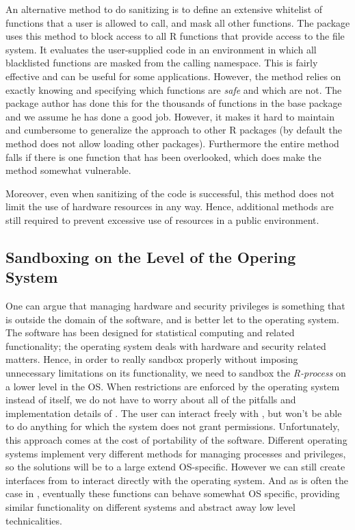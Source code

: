 \documentclass[article]{jss}
\begin{document}
An alternative method to do sanitizing is to define an extensive whitelist of
functions that a user is allowed to call, and mask all other functions. The
 \citep{sandboxR} package uses this method to block access
to all R functions that provide access to the file system. It evaluates
the user-supplied code in an environment in which all blacklisted
functions are masked from the calling namespace. This is fairly effective and
can be useful for some applications. However, the method relies on exactly
knowing and specifying which functions are \emph{safe} and which are not. The
package author has done this for the thousands of  functions in the
base package and we assume he has done a good job. However, it makes it hard to
maintain and cumbersome to generalize the approach to other R packages (by
default the method does not allow loading other packages). Furthermore the
entire method falls if there is one function that has been
overlooked, which does make the method somewhat vulnerable.

Moreover, even when sanitizing of the code is successful, this method does not
limit the use of hardware resources in any way. Hence, additional methods are
still required to prevent excessive use of resources in a public environment.

\subsection{Sandboxing on the Level of the Opering System}

One can argue that managing hardware and security privileges is something that
is outside the domain of the  software, and is better let to the
operating system. The  software has been designed for statistical
computing and related functionality; the operating system deals with hardware
and security related matters. Hence, in order to really sandbox 
properly without imposing unnecessary limitations on its functionality, we need
to sandbox the \emph{R-process} on a lower level in the OS. When restrictions
are enforced by the operating system instead of  itself, we do not
have to worry about all of the pitfalls and implementation details of
. The user can interact freely with , but won't be able
to do anything for which the system does not grant permissions. Unfortunately,
this approach comes at the cost of portability of the software. Different
operating systems implement very different methods for managing processes and
privileges, so the solutions will be to a large extend OS-specific. However we
can still create interfaces from  to interact directly with the
operating system. And as is often the case in , eventually these
functions can behave somewhat OS specific, providing similar functionality on
different systems and abstract away low level technicalities.
\end{document}
